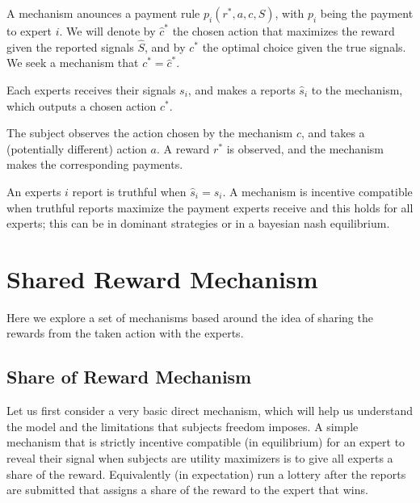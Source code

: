 A mechanism anounces a payment rule $p_i(r^*,a,c,S)$, with $p_i$ being the payment to expert $i$. We will denote by $\hat{c}^{*}$ the chosen action that maximizes the reward given the reported signals $\hat{S}$, and by $c^{*}$ the optimal choice given the true signals.
We seek a mechanism that  $c^{*} = \hat{c}^{*}$.

Each experts receives their signals $s_i$, and makes a reports $\hat{s}_i$ to the mechanism, which outputs a chosen action $c^{*}$.

The subject observes the action chosen by the mechanism $c$, and takes a (potentially different) action $a$. A reward $r^{*}$ is observed, and the mechanism makes the corresponding payments.


%


An experts $i$ report is truthful when $\hat{s}_i=s_i$. A mechanism is incentive compatible when truthful reports maximize the payment experts receive and this holds for all experts; this can be in dominant strategies or in a bayesian nash equilibrium.

\section{Shared Reward Mechanism}

Here we explore a set of mechanisms based around the idea of sharing the rewards from the taken action with the experts.

\subsection{Share of Reward Mechanism}

Let us first consider a very basic direct mechanism, which will help us understand the model and the limitations that subjects freedom imposes. 
A simple mechanism that is strictly incentive compatible (in equilibrium) for an expert to reveal their signal when subjects are utility maximizers is to give all experts a share of the reward. Equivalently (in expectation) run a lottery after the reports are submitted that assigns a share of the reward to the expert that wins. 

